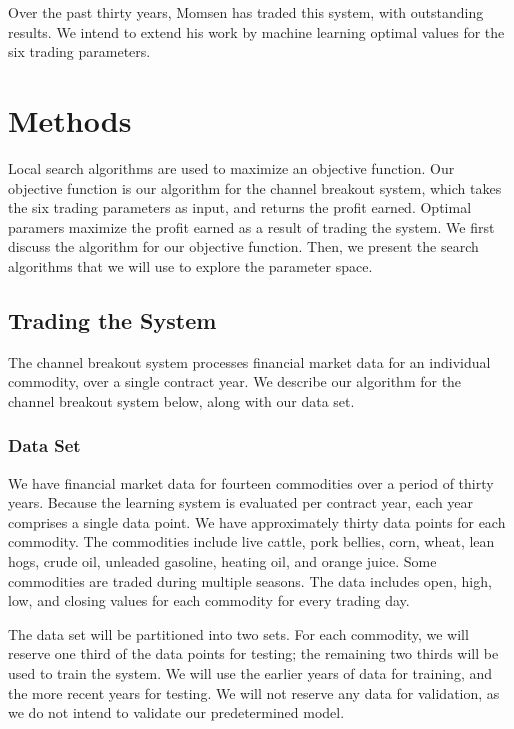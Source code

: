 \documentclass[12pt]{article}
\begin{document}
Over the past thirty years, Momsen has traded this system, with outstanding
results.  We intend to extend his work by machine learning optimal values for
the six trading parameters.

\section{Methods}

Local search algorithms are used to maximize an objective function. Our
objective function is our algorithm for the channel breakout system, which
takes the six trading parameters as input, and returns the profit
earned. Optimal paramers maximize the profit earned as a result of trading the
system. We first discuss the algorithm for our objective function. Then, we
present the search algorithms that we will use to explore the parameter space.

\subsection{Trading the System}

The channel breakout system processes financial market data for an individual
commodity, over a single contract year.  We describe our algorithm for the
channel breakout system below, along with our data set.

\vspace{25pt}
\subsubsection{Data Set}

We have financial market data for fourteen commodities over a period of thirty
years.  Because the learning system is evaluated per contract year, each year
comprises a single data point.  We have approximately thirty data points for
each commodity.  The commodities include live cattle, pork bellies, corn,
wheat, lean hogs, crude oil, unleaded gasoline, heating oil, and orange juice.
Some commodities are traded during multiple seasons.  The data includes open,
high, low, and closing values for each commodity for every trading day.

The data set will be partitioned into two sets. For each commodity, we will
reserve one third of the data points for testing; the remaining two thirds will
be used to train the system. We will use the earlier years of data for
training, and the more recent years for testing. We will not reserve any data
for validation, as we do not intend to validate our predetermined model.
\end{document}

